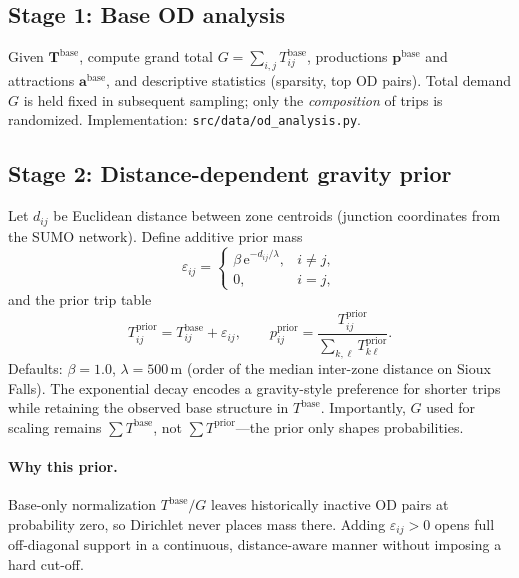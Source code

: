 \documentclass[11pt,a4paper]{report}
\newcommand{\Tbase}{\mathbf{T}^{\mathrm{base}}}
\newcommand{\mathbfp}{\mathbf{p}}
\newcommand{\mathbfa}{\mathbf{a}}
\begin{document}
\subsection{Stage 1: Base OD analysis}
\label{sec:ch1-base}

Given $\Tbase$, compute grand total $G=\sum_{i,j}T^{\mathrm{base}}_{ij}$, productions $\mathbfp^{\mathrm{base}}$ and attractions $\mathbfa^{\mathrm{base}}$, and descriptive statistics (sparsity, top OD pairs). Total demand $G$ is held fixed in subsequent sampling; only the \emph{composition} of trips is randomized. Implementation: \texttt{src/data/od\_analysis.py}.

\subsection{Stage 2: Distance-dependent gravity prior}
\label{sec:ch1-prior}

Let $d_{ij}$ be Euclidean distance between zone centroids (junction coordinates from the SUMO network). Define additive prior mass
\begin{equation}
    \varepsilon_{ij} =
    \begin{cases}
      \beta\,\mathrm{e}^{-d_{ij}/\lambda}, & i\neq j, \\
      0, & i=j,
    \end{cases}
    \label{eq:epsilon}
\end{equation}
and the prior trip table
\begin{equation}
    T^{\mathrm{prior}}_{ij} = T^{\mathrm{base}}_{ij} + \varepsilon_{ij}, \qquad
    p^{\mathrm{prior}}_{ij}
    = \frac{T^{\mathrm{prior}}_{ij}}{\sum_{k,\ell} T^{\mathrm{prior}}_{k\ell}}.
    \label{eq:prior}
\end{equation}
Defaults: $\beta=1.0$, $\lambda=500\,\mathrm{m}$ (order of the median inter-zone distance on Sioux Falls). The exponential decay encodes a gravity-style preference for shorter trips while retaining the observed base structure in $T^{\mathrm{base}}$. Importantly, $G$ used for scaling remains $\sum T^{\mathrm{base}}$, not $\sum T^{\mathrm{prior}}$---the prior only shapes probabilities.

\paragraph{Why this prior.}
Base-only normalization $T^{\mathrm{base}}/G$ leaves historically inactive OD pairs at probability zero, so Dirichlet never places mass there. Adding $\varepsilon_{ij}>0$ opens full off-diagonal support in a continuous, distance-aware manner without imposing a hard cut-off.
\end{document}
